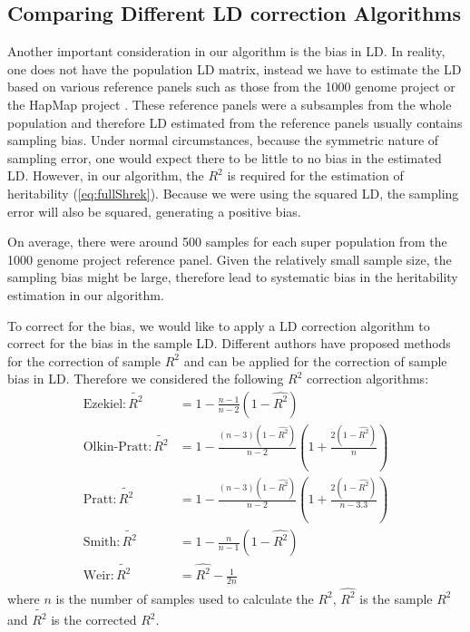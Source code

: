 	\subsection{Comparing Different LD correction Algorithms}
		\label{sec:ldSim}
		Another important consideration in our algorithm is the bias in \gls{LD}.
		In reality, one does not have the population \gls{LD} matrix, instead we have to estimate the \gls{LD} based on various reference panels such as those from the 1000 genome project \citep{Project2012} or the HapMap project \citep{Altshuler2010}.
		These reference panels were a subsamples from the whole population and therefore \gls{LD} estimated from the reference panels usually contains sampling bias.
		Under normal circumstances, because the symmetric nature of sampling error, one would expect there to be little to no bias in the estimated \gls{LD}.
		However, in our algorithm, the $R^2$ is required for the estimation of heritability (\cref{eq:fullShrek}).
		Because we were using the squared \gls{LD}, the sampling error will also be squared, generating a positive bias. 
		
		On average, there were around 500 samples for each super population from the 1000 genome project reference panel.
		Given the relatively small sample size, the sampling bias might be large, therefore lead to systematic bias in the heritability estimation in our algorithm.
		
		To correct for the bias, we would like to apply a \gls{LD} correction algorithm to correct for the bias in the sample \gls{LD}.
		Different authors \citep{Weir1980,Wang2007} have proposed methods for the correction of sample $R^2$ and can be applied for the correction of sample bias in \gls{LD}.
		Therefore we considered the following $R^2$ correction algorithms:
		\begin{align}
		\text{Ezekiel}: \tilde{R^2}&= 1-\frac{n-1}{n-2}(1-\hat{R^2})\label{eq:ezekiel} \\
		\text{Olkin-Pratt}: \tilde{R^2}&=1-\frac{(n-3)(1-\hat{R^2})}{n-2}(1+\frac{2(1-\hat{R^2})}{n})\label{eq:okin} \\
		\text{Pratt}: \tilde{R^2}&=1-\frac{(n-3)(1-\hat{R^2})}{n-2}(1+\frac{2(1-\hat{R^2})}{n-3.3})\label{eq:pratt} \\
		\text{Smith}: \tilde{R^2}&=1-\frac{n}{n-1}(1-\hat{R^2}) \label{eq:smith}\\
		\text{Weir}: \tilde{R^2}&=\hat{R^2}-\frac{1}{2n} \label{eq:weir}
		\end{align}
		where $n$ is the number of samples used to calculate the $R^2$, $\hat{R^2}$ is the sample $R^2$ and $\tilde{R^2}$ is the corrected $R^2$.
		
